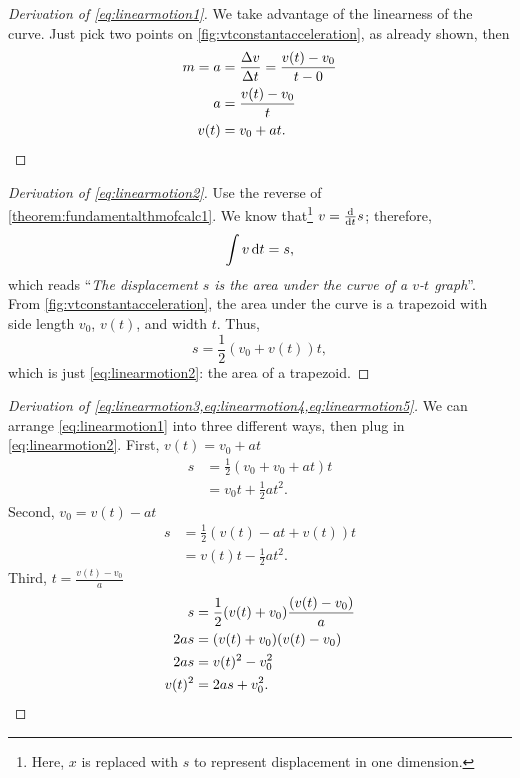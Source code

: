 \begin{multicols}{2}
\begin{proof}[Derivation of \cref{eq:linearmotion1}]
    We take advantage of the linearness of the curve. Just pick two points on \cref{fig:vtconstantacceleration}, as already shown, then
    \begin{align*}
        m = a &= \frac{\Delta v}{\Delta t} = \frac{v(t) - v_0}{t - 0} \\
        a & = \frac{v(t) - v_0}{t} \\
        v(t) &= v_0 + at.\qedhere
    \end{align*}
\end{proof}

\begin{proof}[Derivation of \cref{eq:linearmotion2}] 
    Use the reverse of \cref{theorem:fundamentalthmofcalc1}. We know that\footnote{Here, $x$ is replaced with $s$ to represent displacement in one dimension.} $v = \odv*{s}{t}$; therefore,
    \begin{equation*}
        \int v\odif{t} = s,
    \end{equation*}
    which reads ``\emph{The displacement $s$ is the area under the curve of a $v$-$t$ graph}''. From \cref{fig:vtconstantacceleration}, the area under the curve is a trapezoid with side length $v_0$, $v(t)$, and width $t$. Thus,
    \begin{equation*}
        s = \frac{1}{2}(v_0 + v(t))t,
    \end{equation*}
    which is just \cref{eq:linearmotion2}: the area of a trapezoid.
\end{proof}

\begin{proof}[Derivation of \cref{eq:linearmotion3,eq:linearmotion4,eq:linearmotion5}]
    We can arrange \cref{eq:linearmotion1} into three different ways, then plug in \cref{eq:linearmotion2}.
    First, $v(t) = v_0 + at$
    \begin{align*}
        s &= \frac{1}{2}(v_0 + v_0 + at)t \\
        &= v_0t + \frac{1}{2}at^2. 
    \end{align*}
    Second, $v_0 = v(t) - at$
    \begin{align*}
        s &= \frac{1}{2}(v(t) - at + v(t))t \\
        &= v(t)t - \frac{1}{2}at^2. 
    \end{align*}
    Third, $\displaystyle{t = \frac{v(t) - v_0}{a}}$
    \begin{align*}
        s &= \frac{1}{2}(v(t) + v_0)\frac{(v(t) - v_0)}{a} \\
        2as &= (v(t) + v_0)(v(t) - v_0) \\
        2as &= v(t)^2 - v_0^2 \\
        v(t)^2 &= 2as + v_0^2. \qedhere
    \end{align*}
\end{proof}
\end{multicols}

